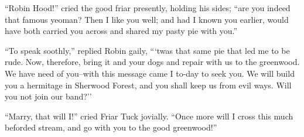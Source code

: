 ``Robin Hood!'' cried the good friar presently, holding his sides; ``are
you indeed that famous yeoman? Then I like you well; and had I known you
earlier, would have both carried you across and shared my pasty pie with
you.''

``To speak soothly,'' replied Robin gaily, ```twas that same pie that
led me to be rude. Now, therefore, bring it and your dogs and repair
with us to the greenwood. We have need of you--with this message came I
to-day to seek you. We will build you a hermitage in Sherwood Forest,
and you shall keep us from evil ways. Will you not join our band?''

``Marry, that will I!'' cried Friar Tuck jovially. ``Once more will I
cross this much beforded stream, and go with you to the good
greenwood!''
